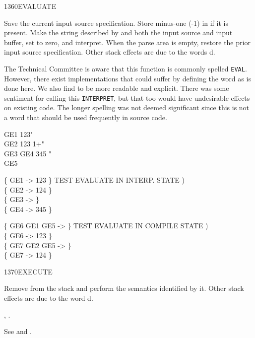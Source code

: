 \begin{worddef}{1360}{EVALUATE}
\item {}

	Save the current input source specification. Store minus-one
	(-1) in  if it is present. Make the string
	described by  and  both the input source
	and input buffer, set  to zero, and interpret. When
	the parse area is empty, restore the prior input source
	specification. Other stack effects are due to the words
	d.

	\begin{defer}
	\rationale %
		The Technical Committee is aware that this function is
		commonly spelled \texttt{EVAL}. However, there exist
		implementations that could suffer by defining the word as is
		done here. We also find  to be more readable
		and explicit. There was some sentiment for calling this
		\texttt{INTERPRET}, but that too would have undesirable
		effects on existing code. The longer spelling was not deemed
		significant since this is not a word that should be used
		frequently in source code.

	\testing
		\word{:} GE1  123" \word{;}  \\
		\word{:} GE2  123 1+" \word{;}  \\
		\word{:} GE3  \word{:} GE4 345 \word{;}" \word{;} \\
		\word{:} GE5  \word{;} 

		\{ GE1  -> 123 \} \tab[3]  TEST EVALUATE IN INTERP. STATE ) \\
		\{ GE2  -> 124 \} \\
		\{ GE3  ->     \} \\
		\{ GE4                 -> 345 \}

		\{ \word{:} GE6 GE1 GE5 \word{;} -> \} \tab[3.4]  TEST EVALUATE IN COMPILE STATE ) \\
		\{ GE6 -> 123 \} \\
		\{ \word{:} GE7 GE2 GE5 \word{;} -> \} \\
		\{ GE7 -> 124 \} \\
	\end{defer}
\end{worddef}


\begin{worddef}{1370}{EXECUTE}
\item {}

	Remove  from the stack and perform the semantics
	identified by it. Other stack effects are due to the word
	d.

\see {},
	\wref{core:[']}{[']}.

	\begin{defer}
	\testing*
		See  and \rref{core:[']}{[']}.
	\end{defer}
\end{worddef}


